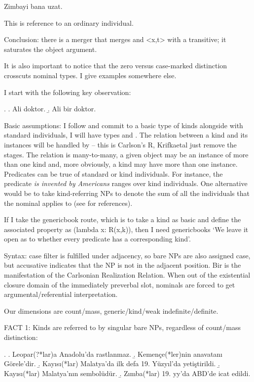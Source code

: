 \documentclass[11pt,a4paper]{article}
\begin{document}
Zimbayi bana uzat.

This is reference to an ordinary individual.

Conclusion: there is a merger that merges and <x,t> with a transitive; it saturates the object argument.


It is also important to notice that the zero versus case-marked distinction crosscuts nominal types. I give examples somewhere else.

I start with the following key observation:

\ex.\label{ex:doktor} 
\a. Ali doktor.
\b. Ali bir doktor.

Basic assumptions: I follow \cite[p.\ 64]{krifkaetal95} and commit to a basic type of kinds alongside with standard individuals, I will have types  and . The relation between a kind and its instances will be handled by  -- this is Carlson's R, Krifkaetal just remove the stages. The relation is many-to-many, a given object may be an instance of more than one kind and, more obviously, a kind may have more than one instance. Predicates can be true of standard or kind individuals. For instance, the predicate \textit{is invented by Americans} ranges over kind individuals. One alternative would be to take kind-referring NPs to denote the sum of all the individuals that the nominal applies to (see \cite{krifkaetal95} for references).

If I take the genericbook route, which is to take a kind as basic and define the associated property as (lambda x: R(x,k)), then I need genericbooks `We leave it open as to whether every predicate has a corresponding kind'.

Syntax: case filter is fulfilled under adjacency, so bare NPs are also assigned case, but accusative indicates that the NP is not in the adjacent position. Bir is the manifestation of the Carlsonian Realization Relation. When out of the existential closure domain of the immediately preverbal slot, nominals are forced to get argumental/referential interpretation.

\begin{comment}
Krifkaetal
* p87 incorporation and kind-reference.
\end{comment}

Our dimensions are count/mass, generic/kind/weak indefinite/definite.

FACT 1: Kinds are referred to by singular bare NPs, regardless of count/mass distinction:

\ex.
\a. Leopar(?*lar)a Anadolu'da rastlanmaz.
\b. Kemençe(*ler)nin anavatanı Görele'dir.
\b. Kayısı(*lar) Malatya'da ilk defa 19. Yüzyıl'da yetiştirildi. 
\b. Kayısı(*lar) Malatya'nın sembolüdür.
\b. Zımba(*lar) 19. yy'da ABD'de icat edildi.
\end{document}
